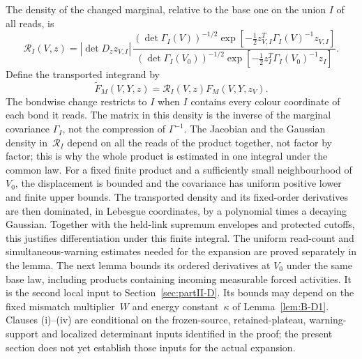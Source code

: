 The density of the changed marginal, relative to the base one on the union $I$ of all reads, is
\begin{equation*}
\mathcal R_I(V,z)=|\det D_z z_{V,I}|\,
\frac{(\det\Gamma_I(V))^{-1/2}\exp[-\tfrac12z_{V,I}^T\Gamma_I(V)^{-1}z_{V,I}]}
{(\det\Gamma_I(V_0))^{-1/2}\exp[-\tfrac12z_I^T\Gamma_I(V_0)^{-1}z_I]}.
\end{equation*}
Define the transported integrand by
\begin{equation*}
\widetilde F_M(V,Y,z)=\mathcal R_I(V,z)F_M(V,Y,z_V).
\end{equation*}
The bondwise change restricts to $I$ when $I$ contains every colour coordinate of each bond it reads. The matrix in this density is the inverse of the marginal covariance $\Gamma_I$, not the compression of $\Gamma^{-1}$. The Jacobian and the Gaussian density in~$\mathcal R_I$ depend on all the reads of the product together, not factor by factor; this is why the whole product is estimated in one integral under the common law. For a fixed finite product and a sufficiently small neighbourhood of $V_0$, the displacement is bounded and the covariance has uniform positive lower and finite upper bounds. The transported density and its fixed-order derivatives are then dominated, in Lebesgue coordinates, by a polynomial times a decaying Gaussian. Together with the held-link supremum envelopes and protected cutoffs, this justifies differentiation under this finite integral. The uniform read-count and simultaneous-warning estimates needed for the expansion are proved separately in the lemma.
The next lemma bounds its ordered derivatives at $V_0$ under the same base law, including products containing incoming measurable forced activities. It is the second local input to Section~\ref{sec:partII-D}. Its bounds may depend on the fixed mismatch multiplier~$W$ and energy constant~$\kappa$ of Lemma~\ref{lem:B-D1}. Clauses (i)--(iv) are conditional on the frozen-source, retained-plateau, warning-support and localized determinant inputs identified in the proof; the present section does not yet establish those inputs for the actual expansion.

